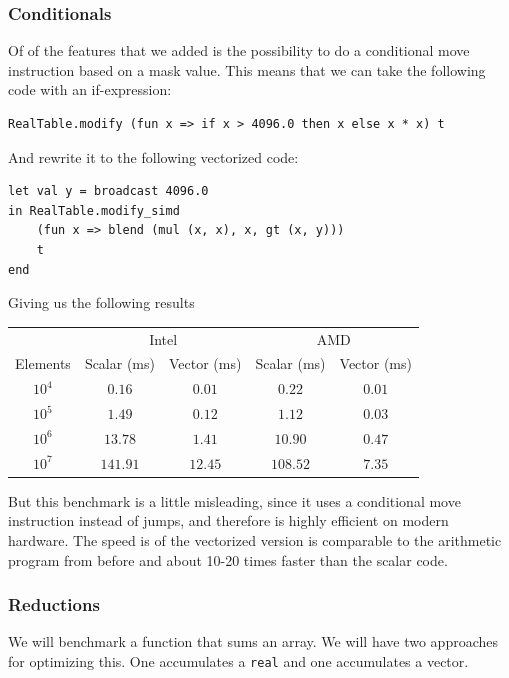 \documentclass{article}
\begin{document}
\subsubsection{Conditionals}
Of of the features that we added is the possibility to do a conditional move instruction based on a mask value. This means that we can take the following code with an if-expression:
\begin{verbatim}
RealTable.modify (fun x => if x > 4096.0 then x else x * x) t
\end{verbatim}
And rewrite it to the following vectorized code:
\begin{verbatim}
let val y = broadcast 4096.0
in RealTable.modify_simd
    (fun x => blend (mul (x, x), x, gt (x, y)))
    t
end
\end{verbatim}
Giving us the following results

\begin{center}
\begin{tabular}{c c c c c}
    \toprule
    & \multicolumn{2}{c}{Intel} & \multicolumn{2}{c}{AMD} \\
    Elements & Scalar (ms) & Vector (ms) & Scalar (ms) & Vector (ms) \\
    \midrule
    $10^4$ & $0.16$ & $0.01$ & $0.22$ & $0.01$ \\
    $10^5$ & $1.49$ & $0.12$ & $1.12$ & $0.03$ \\
    $10^6$ & $13.78$ & $1.41$ & $10.90$ & $0.47$ \\
    $10^7$ & $141.91$ & $12.45$ & $108.52$ & $7.35$ \\
    \bottomrule
\end{tabular}
\end{center}

But this benchmark is a little misleading, since it uses a conditional move instruction instead of jumps, and therefore is highly efficient on modern hardware. The speed is of the vectorized version is comparable to the arithmetic program from before and about 10-20 times faster than the scalar code.

\subsubsection{Reductions}

We will benchmark a function that sums an array. We will have two approaches for optimizing this. One accumulates a \verb!real! and one accumulates a vector.
\end{document}
